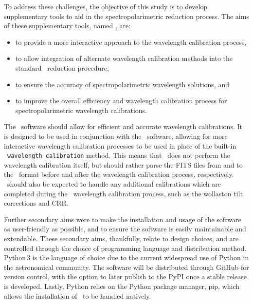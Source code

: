 To address these challenges, the objective of this study is to develop supplementary tools to aid in the spectro\-polarimetric reduction process.
The aims of these supplementary tools, named \stops, are:
\begin{itemize}
    \item to provide a more interactive approach to the wavelength calibration process,
    \item to allow integration of alternate wavelength calibration methods into the standard \polsalt\ reduction procedure,
    \item to ensure the accuracy of spectropolarimetric wavelength solutions, and
    \item to improve the overall efficiency and wavelength calibration process for spectro\-polarimetric wavelength calibrations.
\end{itemize}
The \stops\ software should allow for efficient and accurate wavelength calibrations.
It is designed to be used in conjunction with the \polsalt\ software, allowing for more interactive wavelength calibration processes to be used in place of the built-in \polsalt\ \texttt{wavelength calibration} method.
This means that \stops\ does not perform the wavelength calibration itself, but should rather parse the \gls{FITS} files from and to the \polsalt\ format before and after the wavelength calibration process, respectively.
\stops\ should also be expected to handle any additional calibrations which are completed during the \polsalt\ wavelength calibration process, such as the wollaston tilt corrections and \gls{CRR}.

Further secondary aims were to make the installation and usage of the software as user-friendly as possible, and to ensure the software is easily maintainable and extendable.
These secondary aims, thankfully, relate to design choices, and are controlled through the choice of programming language and distribution method.
Python\,$3$ is the language of choice due to the current widespread use of Python in the astronomical community.
The software will be distributed through GitHub for version control, with the option to later publish to the \gls{PyPI} once a stable release is developed.
Lastly, Python relies on the Python package manager, pip, which allows the installation of \stops\ to be handled natively.

